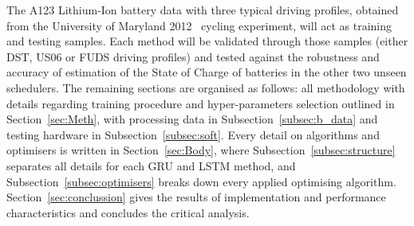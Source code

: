 The A123 Lithium-Ion battery data with three typical driving profiles, obtained from the University of Maryland 2012~\cite{noauthor_calce_2017} cycling experiment, will act as training and testing samples.
Each method will be validated through those samples (either DST, US06 or FUDS driving profiles) and tested against the robustness and accuracy of estimation of the State of Charge of batteries in the other two unseen schedulers.
%
The remaining sections are organised as follows: all methodology with details regarding training procedure and hyper-parameters selection outlined in Section~\ref{sec:Meth}, with processing data in Subsection~\ref{subsec:b_data} and testing hardware in Subsection~\ref{subsec:soft}.
Every detail on algorithms and optimisers is written in Section~\ref{sec:Body}, where Subsection~\ref{subsec:structure} separates all details for each GRU and LSTM method, and Subsection~\ref{subsec:optimisers} breaks down every applied optimising algorithm.
Section~\ref{sec:conclussion} gives the results of implementation and performance characteristics and concludes the critical analysis.
